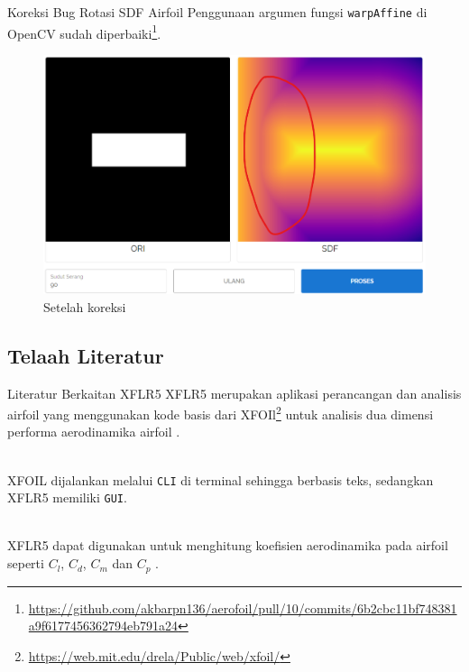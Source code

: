 \begin{frame}{Koreksi Bug Rotasi SDF Airfoil}
  Penggunaan argumen fungsi \texttt{warpAffine} di OpenCV sudah diperbaiki\footnote{\url{https://github.com/akbarpn136/aerofoil/pull/10/commits/6b2cbc11bf748381a9f6177456362794eb791a24}}.

   \begin{figure}[h]
    \centering
    \includegraphics[width=0.5\linewidth]{statics/bug_rotasi}
    \caption{Setelah koreksi}
  \end{figure}
\end{frame}

\subsection{Telaah Literatur}

\begin{frame}{Literatur Berkaitan XFLR5}
  XFLR5 merupakan aplikasi perancangan dan analisis airfoil yang menggunakan kode basis dari XFOIl\footnote{\url{https://web.mit.edu/drela/Public/web/xfoil/}} untuk analisis dua dimensi performa aerodinamika airfoil \cite{guzelbey2018numerical}.\\~\\

  \pause

  XFOIL dijalankan melalui \texttt{CLI} di terminal sehingga berbasis teks, sedangkan XFLR5 memiliki \texttt{GUI}.\\~\\

  \pause

  XFLR5 dapat digunakan untuk menghitung koefisien aerodinamika pada airfoil seperti $C_l$, $C_d$, $C_m$ dan $C_p$ \cite{Deperrois2009}.
\end{frame}

